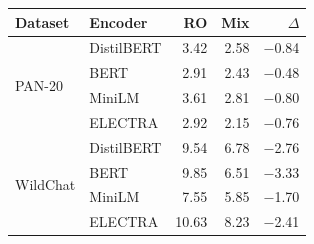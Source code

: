 \documentclass[11pt]{article}
\begin{document}
\begin{center}
\small
\begin{tabular}{l l rrr}
\toprule
\textbf{Dataset} & \textbf{Encoder} & \textbf{RO} & \textbf{Mix} & \textbf{$\Delta$} \\
\midrule
\multirow{4}{*}{PAN-20}
 & DistilBERT & 3.42 & 2.58 & $-$0.84 \\
 & BERT       & 2.91 & 2.43 & $-$0.48 \\
 & MiniLM     & 3.61 & 2.81 & $-$0.80 \\
 & ELECTRA    & 2.92 & 2.15 & $-$0.76 \\
\midrule
\multirow{4}{*}{WildChat}
 & DistilBERT & 9.54 & 6.78 & $-$2.76 \\
 & BERT       & 9.85 & 6.51 & $-$3.33 \\
 & MiniLM     & 7.55 & 5.85 & $-$1.70 \\
 & ELECTRA    & 10.63 & 8.23 & $-$2.41 \\
\bottomrule
\end{tabular}
\label{tab:robustness_gap}
\end{center}
\end{document}
